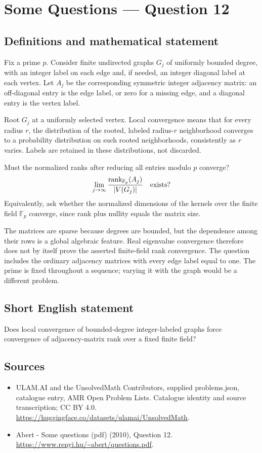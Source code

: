 \documentclass[11pt,a4paper]{article}
\begin{document}
\section*{Some Questions — Question 12}\label{statement}

\subsection{Definitions and mathematical statement}
Fix a prime $p$. Consider finite undirected graphs $G_j$ of uniformly bounded degree, with an integer label on each edge and, if needed, an integer diagonal label at each vertex. Let $A_j$ be the corresponding symmetric integer adjacency matrix: an off-diagonal entry is the edge label, or zero for a missing edge, and a diagonal entry is the vertex label.

Root $G_j$ at a uniformly selected vertex. Local convergence means that for every radius $r$, the distribution of the rooted, labeled radius-$r$ neighborhood converges to a probability distribution on such rooted neighborhoods, consistently as $r$ varies. Labels are retained in these distributions, not discarded.

Must the normalized ranks after reducing all entries modulo $p$ converge?
\[
 \lim_{j\to\infty}\frac{\operatorname{rank}_{\mathbb F_p}(A_j)}{|V(G_j)|}
                    \quad\hbox{exists?}
\]
Equivalently, ask whether the normalized dimensions of the kernels over the finite field $\mathbb F_p$ converge, since rank plus nullity equals the matrix size.

The matrices are sparse because degrees are bounded, but the dependence among their rows is a global algebraic feature. Real eigenvalue convergence therefore does not by itself prove the asserted finite-field rank convergence. The question includes the ordinary adjacency matrices with every edge label equal to one. The prime is fixed throughout a sequence; varying it with the graph would be a different problem.
\subsection{Short English statement}
Does local convergence of bounded-degree integer-labeled graphs force convergence of adjacency-matrix rank over a fixed finite field?
\subsection{Sources}
\begin{itemize}
\item[S1] ULAM.AI and the UnsolvedMath Contributors, supplied problems.json, catalogue entry, AMR Open Problem Lists. Catalogue identity and source transcription; CC BY 4.0.
\url{https://huggingface.co/datasets/ulamai/UnsolvedMath}.
\item[S2] Abert - Some questions (pdf) (2010), Question 12. 
\url{https://www.renyi.hu/~abert/questions.pdf}.
\end{itemize}
\end{document}
